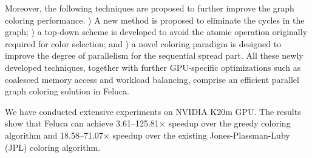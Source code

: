 Moreover, the following techniques are proposed to further improve the graph coloring performance. ) A new method is proposed to eliminate the cycles in the graph; ) a top-down scheme is developed to avoid the atomic operation originally required for color selection; and ) a novel coloring  paradigm is designed to improve the degree of parallelism for the sequential spread part. All these newly developed techniques, together with further GPU-specific optimizations such as coalesced memory access and workload balancing, comprise an efficient parallel graph coloring solution in Feluca.

We have conducted extensive experiments on NVIDIA K20m GPU. The results show that Feluca can achieve 3.61--125.81$\times$ speedup over the greedy coloring algorithm and 18.58--71.07$\times$ speedup over the existing Jones-Plassman-Luby (JPL) coloring algorithm. 

